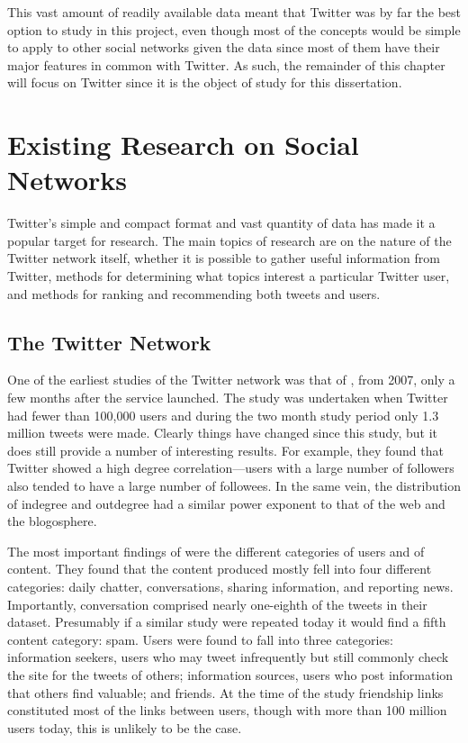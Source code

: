 This vast amount of readily available data meant that Twitter was by far the best option to study in this project, even though most of the concepts would be simple to apply to other social networks given the data since most of them have their major features in common with Twitter. As such, the remainder of this chapter will focus on Twitter since it is the object of study for this dissertation.


\section{Existing Research on Social Networks}

Twitter's simple and compact format and vast quantity of data has made it a popular target for research. The main topics of research are on the nature of the Twitter network itself, whether it is possible to gather useful information from Twitter, methods for determining what topics interest a particular Twitter user, and methods for ranking and recommending both tweets and users.

\subsection{The Twitter Network}

One of the earliest studies of the Twitter network was that of \cite{Java2007}, from 2007, only a few months after the service launched. The study was undertaken when Twitter had fewer than 100,000 users and during the two month study period only 1.3 million tweets were made. Clearly things have changed since this study, but it does still provide a number of interesting results. For example, they found that Twitter showed a high degree correlation---users with a large number of followers also tended to have a large number of followees. In the same vein, the distribution of indegree and outdegree had a similar power exponent to that of the web and the blogosphere.

The most important findings of \cite{Java2007} were the different categories of users and of content. They found that the content produced mostly fell into four different categories: daily chatter, conversations, sharing information, and reporting news. Importantly, conversation comprised nearly one-eighth of the tweets in their dataset. Presumably if a similar study were repeated today it would find a fifth content category: spam. Users were found to fall into three categories: information seekers, users who may tweet infrequently but still commonly check the site for the tweets of others; information sources, users who post information that others find valuable; and friends. At the time of the study friendship links constituted most of the links between users, though with more than 100 million users today, this is unlikely to be the case.

